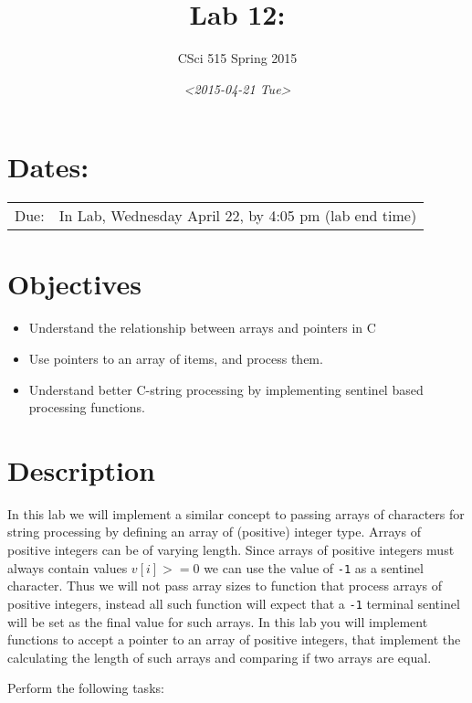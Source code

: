 \documentclass[11pt]{article}
\author{CSci 515 Spring 2015}
\date{\textit{<2015-04-21 Tue>}}
\title{Lab 12:}
\begin{document}
\maketitle

\section*{Dates:}
\label{sec-1}
\begin{center}
\begin{tabular}{ll}
Due: & In Lab, Wednesday April 22, by 4:05 pm (lab end time)\\
\end{tabular}
\end{center}
\section*{Objectives}
\label{sec-2}
\begin{itemize}
\item Understand the relationship between arrays and pointers in C
\item Use pointers to an array of items, and process them.
\item Understand better C-string processing by implementing sentinel based processing functions.
\end{itemize}
\section*{Description}
\label{sec-3}
In this lab we will implement a similar concept to passing arrays of
characters for string processing by defining an array of (positive)
integer type.  Arrays of positive integers can be of varying length.
Since arrays of positive integers must always contain values $v[i] >=
0$ we can use the value of \verb~-1~ as a sentinel character.  Thus we will
not pass array sizes to function that process arrays of positive
integers, instead all such function will expect that a \verb~-1~ terminal
sentinel will be set as the final value for such arrays.  In this lab
you will implement functions to accept a pointer to an array of
positive integers, that implement the calculating the length of such
arrays and comparing if two arrays are equal.

Perform the following tasks:
\end{document}
